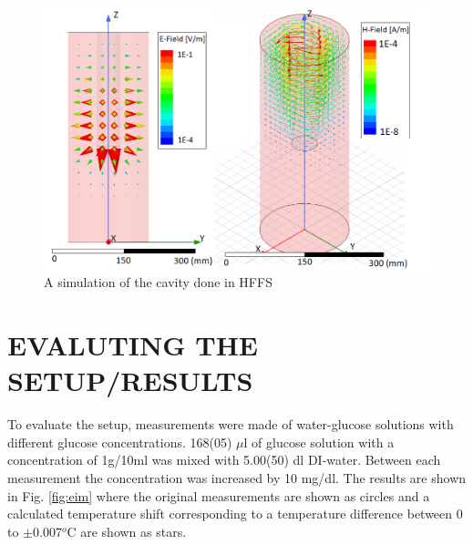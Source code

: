 \documentclass[10pt,final,conference,a4paper,twocolumn]{IEEEtran_AntennEMB_GigaHertz2016}
\begin{document}
\begin{figure}[b]
 	\centering
 	\includegraphics[width=1.0\columnwidth]{EHfield.png}
 	\caption{A simulation of the cavity done in HFFS}
 	\label{fig:sim}
 \end{figure}
\section{EVALUTING THE SETUP/RESULTS}
To evaluate the setup, measurements were made of water-glucose solutions with different glucose concentrations. 168(05) $\mu$l of glucose solution with a concentration of 1g/10ml was mixed with 5.00(50) dl DI-water. Between each measurement the concentration was increased by 10 mg/dl. The results are shown in Fig. \ref{fig:eim} where the original measurements are shown as circles and a calculated temperature shift corresponding to a temperature difference between 0 to $\pm$0.007$^o$C are shown as stars.

\end{document}
